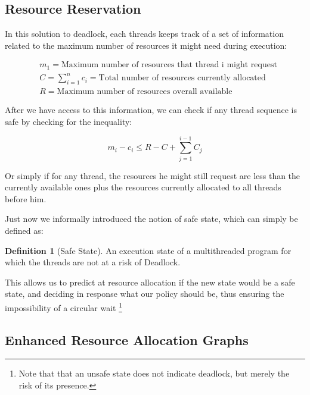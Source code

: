\documentclass[openright, twoside]{report}
\theoremstyle{definition}
\newtheorem{definition}{Definition}[section]
\theoremstyle{example}
\begin{document}
\subsection{Resource Reservation}
In this solution to deadlock, each threads keeps track of a set of information 
related to the maximum number of resources it might need during execution:

\begin{align*}
	&m_1 = \text{Maximum number of resources that thread i might request}\\
	&C = \sum\limits_{i=1}^nc_i = \text{Total number of resources currently allocated}\\
	&R = \text{Maximum number of resources overall available}
\end{align*}

After we have access to this information, we can check if any thread sequence is safe 
by checking for the inequality:

\[ m_i - c_i \leq R - C + \sum\limits_{j=1}^{i-1}C_j\]

Or simply if for any thread, the resources he might still request are less than 
the currently available ones plus the resources currently allocated to all threads 
before him.

Just now we informally introduced the notion of safe state, which can simply be defined as: 

\begin{definition}[Safe State]

	An execution state of a multithreaded program for which the threads are not at a risk of Deadlock.
	
\end{definition}

This allows us to predict at resource allocation if the new state would be a safe state, and 
deciding in response what our policy should be, thus ensuring the impossibility of a circular wait 
\footnote{Note that that an unsafe state does not indicate deadlock, but merely the risk of its presence.}

\subsection{Enhanced Resource Allocation Graphs}
	
\end{document}
